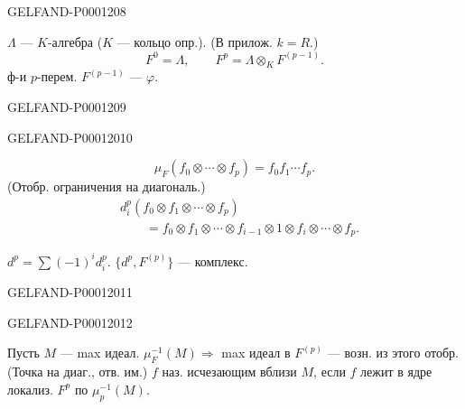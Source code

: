 \begin{GelfandAdjacentEvidence}{GELFAND-P000120}{8}

$\Lambda$ — $K$-алгебра ($K$ — кольцо опр.).
(В прилож. $k=R$.)
\begin{equation*}F^0=\Lambda,\qquad F^p=\Lambda\otimes_KF^{(p-1)}.\end{equation*}
ф-и $p$-перем.
$F^{(p-1)}$ — $\varphi$.
\end{GelfandAdjacentEvidence}
\begin{GelfandAdjacentEvidence}{GELFAND-P000120}{9}

\end{GelfandAdjacentEvidence}
\begin{GelfandAdjacentEvidence}{GELFAND-P000120}{10}

\begin{equation*}\mu_F(f_0\otimes\cdots\otimes f_p)=f_0f_1\cdots f_p.\end{equation*}
(Отобр. ограничения на диагональ.)
\begin{equation*}
\begin{aligned}
&d_i^p(f_0\otimes f_1\otimes\cdots\otimes f_p)\\
&\qquad=f_0\otimes f_1\otimes\cdots\otimes f_{i-1}\otimes1\otimes f_i\otimes\cdots\otimes f_p.
\end{aligned}
\end{equation*}

$d^p=\sum(-1)^id_i^p$.
$\{d^p,F^{(p)}\}$ — комплекс.
\end{GelfandAdjacentEvidence}
\begin{GelfandAdjacentEvidence}{GELFAND-P000120}{11}


\end{GelfandAdjacentEvidence}
\begin{GelfandAdjacentEvidence}{GELFAND-P000120}{12}

Пусть $M$ — max идеал.
$\mu_F^{-1}(M)\Rightarrow$ max идеал в $F^{(p)}$ — возн. из этого отобр.
(Точка на диаг., отв. им.)
$f$ наз. исчезающим вблизи $M$,
если $f$ лежит в ядре локализ. $F^p$ по $\mu_p^{-1}(M)$.
\end{GelfandAdjacentEvidence}
